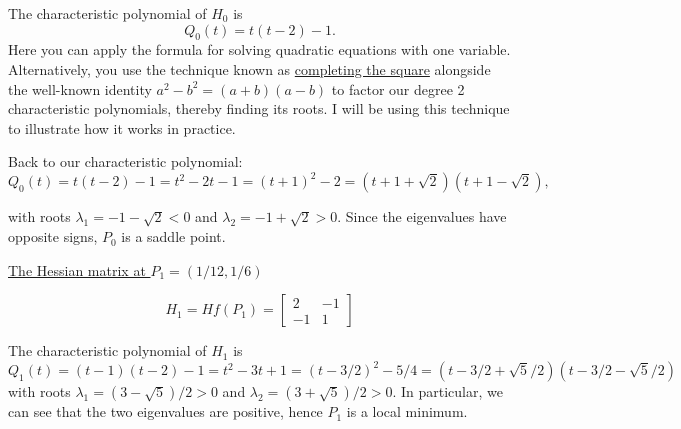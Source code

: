 \documentclass[]{book}
\theoremstyle{definition}
\begin{document}
\begin{enumerate}
\begin{enumerate}
The characteristic polynomial of $H_0$ is 
\[
Q_0(t) = t(t-2)-1.
\] 
Here you can apply the formula for solving quadratic equations with one variable. Alternatively, you use the technique known as \href{https://en.wikipedia.org/wiki/Completing_the_square}{completing the square} alongside the well-known identity $a^2 - b^2 = (a+b)(a-b)$ to factor our degree 2 characteristic polynomials, thereby finding its roots. I will be using this technique to illustrate how it works in practice. 

Back to our characteristic polynomial:
\[
Q_0(t) = t(t-2)-1 = t^2 - 2t - 1 = (t+1)^2 - 2 = (t+1+\sqrt{2})(t+1-\sqrt{2}),
\] 

with roots $\lambda_1 = -1-\sqrt{2}<0$ and $\lambda_2 = -1+\sqrt{2}>0$. Since the eigenvalues have opposite signs, $P_0$ is a saddle point. 

\vspace{1cm}

\underline{The Hessian matrix at $P_1 = (1/12, 1/6)$}

\[
H_1 = Hf(P_1) = \begin{bmatrix}
2 & -1 \\
-1 & 1
\end{bmatrix}
\]

The characteristic polynomial of $H_1$ is 
\[
Q_1(t) =(t-1)(t-2)-1 = t^2 - 3t +1 = (t - 3/2)^2 - 5/4 = (t - 3/2 + \sqrt{5}/2)(t - 3/2 - \sqrt{5}/2)
\]
with roots $\lambda_1 = (3 - \sqrt{5})/2 > 0$ and $\lambda_2=(3 + \sqrt{5})/2 > 0$. In particular, we can see that the two eigenvalues are positive, hence $P_1$ is a local minimum.

\end{enumerate}




\end{enumerate}
\end{document}
